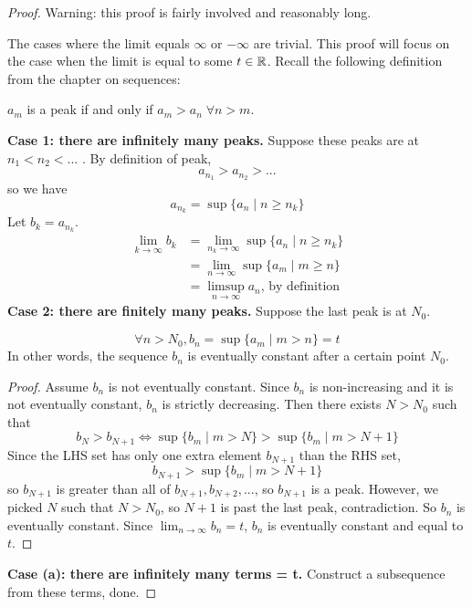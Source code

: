 \begin{proof}
  Warning: this proof is fairly involved and reasonably long. 

  The cases where the limit equals $\infty$ or $-\infty$ are trivial. This proof will focus on the case when the limit is equal to some $t \in \mathbb{R}$. Recall the following definition from the chapter on sequences:
  \begin{definition}
    $a_m$ is a peak if and only if $a_m > a_n \;\forall n > m$.
  \end{definition}
  \textbf{Case 1: there are infinitely many peaks.} Suppose these peaks are at $n_1 < n_2 < ...$ . By definition of peak,
  \[
    a_{n_1} > a_{n_2} > ...
  \]
  so we have
  \[
    a_{n_k} = \sup\{a_n \;|\; n \geq n_k \}
  \]
  Let $b_k = a_{n_k}$.
  \begin{align*}
    \lim_{k \to \infty} b_k &= \lim_{n_k \to \infty} \sup\{a_n \;|\; n \geq n_k \} \\
    &= \lim_{n \to \infty} \sup\{a_m \;|\; m \geq n \} \\
    &= \limsup_{n \to \infty} a_n \text{, by definition} 
  \end{align*}
  \textbf{Case 2: there are finitely many peaks.} Suppose the last peak is at $N_0$.
  \begin{prop}
    \[
      \forall n > N_0, b_n = \sup\{a_m \;|\; m > n \} = t
    \]
    In other words, the sequence $b_n$ is eventually constant after a certain point $N_0$.
  \end{prop}
  \begin{proof}
    Assume $b_n$ is not eventually constant. Since $b_n$ is non-increasing and it is not eventually constant, $b_n$ is strictly decreasing. Then there exists $N > N_0$ such that
    \[
      b_N > b_{N + 1} \iff \sup\{b_m \;|\; m > N \} > \sup\{b_m \;|\; m > N + 1\}
    \]
    Since the LHS set has only one extra element $b_{N + 1}$ than the RHS set,
    \[
      b_{N + 1} > \sup\{b_m \;|\; m > N + 1\}
    \]
    so $b_{N + 1}$ is greater than all of $b_{N + 1}, b_{N + 2}, ...$, so $b_{N + 1}$ is a peak. However, we picked $N$ such that $N > N_0$, so $N + 1$ is past the last peak, contradiction. So $b_n$ is eventually constant. Since $\lim_{n \to \infty} b_n = t$, $b_n$ is eventually constant and equal to $t$.
  \end{proof}
  \textbf{Case (a): there are infinitely many terms = t.} Construct a subsequence from these terms, done.


\end{proof}
